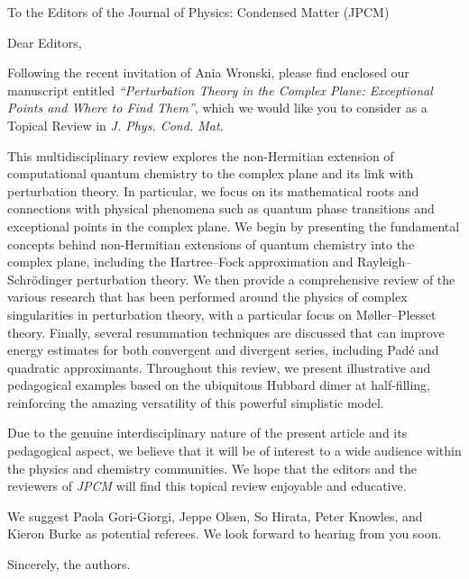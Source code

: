 \documentclass[10pt]{letter}
\begin{document}
\begin{letter}%
{To the Editors of the Journal of Physics: Condensed Matter (JPCM)}

\opening{Dear Editors,}

\justifying
Following the recent invitation of Ania Wronski, please find enclosed our manuscript entitled \textit{``Perturbation Theory in the Complex Plane: Exceptional Points and Where to Find Them''}, which we would like you to consider as a Topical Review in \textit{J. Phys. Cond. Mat.}

This multidisciplinary review explores the non-Hermitian extension of computational quantum chemistry to the complex plane and its link with perturbation theory.
In particular, we focus on its mathematical roots and connections with physical phenomena such as quantum phase transitions and exceptional points in the complex plane.
We begin by presenting the fundamental concepts behind non-Hermitian extensions of quantum chemistry into the complex plane, including the Hartree--Fock approximation and
Rayleigh--Schr\"odinger perturbation theory. 
We then provide a comprehensive review of the various research that has been performed around the physics of complex singularities in perturbation theory, with a particular focus on M{\o}ller--Plesset theory.
Finally, several resummation techniques are discussed that can improve energy estimates for both convergent and divergent series, including Pad\'e and quadratic approximants.
Throughout this review, we present illustrative and pedagogical examples based on the ubiquitous Hubbard dimer at half-filling, reinforcing the amazing versatility of this powerful simplistic model.

Due to the genuine interdisciplinary nature of the present article and its pedagogical aspect, we believe that it will be of interest to a wide audience within the physics and chemistry communities.
We hope that the editors and the reviewers of \textit{JPCM} will find this topical review enjoyable and educative.

We suggest Paola Gori-Giorgi, Jeppe Olsen, So Hirata, Peter Knowles, and Kieron Burke as potential referees.
We look forward to hearing from you soon.

\closing{Sincerely, the authors.}


\end{letter}
\end{document}
